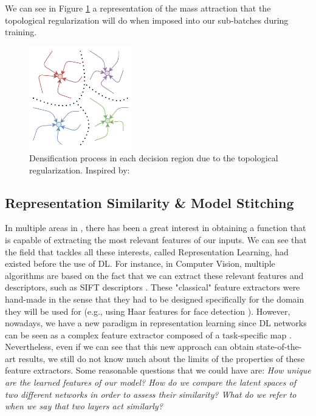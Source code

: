 \documentclass[../main.tex]{subfiles}
\begin{document}
We can see in Figure \ref{fig:attrac} a representation of the mass attraction that the topological regularization will do when imposed into our sub-batches during training.

\begin{figure}[!ht]
    \centering
    \includegraphics[width=0.4\textwidth]{figures/bg/atractor.pdf} 
    \caption{Densification process in each decision region due to the topological regularization. Inspired by: \cite{torres_hopfield_2019}}
    \label{fig:attrac}
\end{figure}

\subsection{Representation Similarity \& Model Stitching}
\label{sec:repLearn}

In multiple areas in , there has been a great interest in obtaining a function that is capable of extracting the most relevant features of our inputs. We can see that the field that tackles all these interests, called Representation Learning, had existed before the use of DL. For instance, in Computer Vision, multiple algorithms are based on the fact that we can extract these relevant features and descriptors, such as SIFT descriptors \cite{gonzalez_digital_2002}. These "classical" feature extractors were hand-made in the sense that they had to be designed specifically for the domain they will be used for (e.g., using Haar features for face detection \cite{viola_rapid_2001}). However, nowadays, we have a new paradigm in representation learning since DL networks can be seen as a complex feature extractor composed of a task-specific map \cite{moschella_relative_2022}. Nevertheless, even if we can see that this new approach can obtain state-of-the-art results, we still do not know much about the limits of the properties of these feature extractors. Some reasonable questions that we could have are: \textit{How unique are the learned features of our model? How do we compare the latent spaces of two different networks in order to assess their similarity? What do we refer to when we say that two layers act similarly?}
\end{document}
